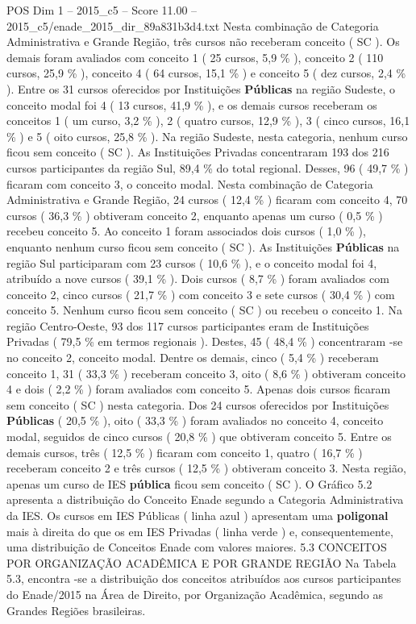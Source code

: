 \begin{textsample}{POS Dim 1 – 2015\_c5 – Score 11.00 – 2015\_c5/enade\_2015\_dir\_89a831b3d4.txt}
Nesta combinação de Categoria Administrativa e Grande Região, três cursos não receberam conceito ( SC ).
Os demais foram avaliados com conceito 1 ( 25 cursos, 5,9 \% ), conceito 2 ( 110 cursos, 25,9 \% ), conceito 4 ( 64 cursos, 15,1 \% ) e conceito 5 ( dez cursos, 2,4 \% ).
Entre os 31 cursos oferecidos por Instituições \textbf{Públicas} na região Sudeste, o conceito modal foi 4 ( 13 cursos, 41,9 \% ), e os demais cursos receberam os conceitos 1 ( um curso, 3,2 \% ), 2 ( quatro cursos, 12,9 \% ), 3 ( cinco cursos, 16,1 \% ) e 5 ( oito cursos, 25,8 \% ).
Na região Sudeste, nesta categoria, nenhum curso ficou sem conceito ( SC ).
As Instituições Privadas concentraram 193 dos 216 cursos participantes da região Sul, 89,4 \% do total regional.
Desses, 96 ( 49,7 \% ) ficaram com conceito 3, o conceito modal.
Nesta combinação de Categoria Administrativa e Grande Região, 24 cursos ( 12,4 \% ) ficaram com conceito 4, 70 cursos ( 36,3 \% ) obtiveram conceito 2, enquanto apenas um curso ( 0,5 \% ) recebeu conceito 5.
Ao conceito 1 foram associados dois cursos ( 1,0 \% ), enquanto nenhum curso ficou sem conceito ( SC ).
As Instituições \textbf{Públicas} na região Sul participaram com 23 cursos ( 10,6 \% ), e o conceito modal foi 4, atribuído a nove cursos ( 39,1 \% ).
Dois cursos ( 8,7 \% ) foram avaliados com conceito 2, cinco cursos ( 21,7 \% ) com conceito 3 e sete cursos ( 30,4 \% ) com conceito 5.
Nenhum curso ficou sem conceito ( SC ) ou recebeu o conceito 1.
Na região Centro-Oeste, 93 dos 117 cursos participantes eram de Instituições Privadas ( 79,5 \% em termos regionais ).
Destes, 45 ( 48,4 \% ) concentraram -se no conceito 2, conceito modal.
Dentre os demais, cinco ( 5,4 \% ) receberam conceito 1, 31 ( 33,3 \% ) receberam conceito 3, oito ( 8,6 \% ) obtiveram conceito 4 e dois ( 2,2 \% ) foram avaliados com conceito 5.
Apenas dois cursos ficaram sem conceito ( SC ) nesta categoria.
Dos 24 cursos oferecidos por Instituições \textbf{Públicas} ( 20,5 \% ), oito ( 33,3 \% ) foram avaliados no conceito 4, conceito modal, seguidos de cinco cursos ( 20,8 \% ) que obtiveram conceito 5.
Entre os demais cursos, três ( 12,5 \% ) ficaram com conceito 1, quatro ( 16,7 \% ) receberam conceito 2 e três cursos ( 12,5 \% ) obtiveram conceito 3.
Nesta região, apenas um curso de IES \textbf{pública} ficou sem conceito ( SC ).
O Gráfico 5.2 apresenta a distribuição do Conceito Enade segundo a Categoria Administrativa da IES.
Os cursos em IES Públicas ( linha azul ) apresentam uma \textbf{poligonal} mais à direita do que os em IES Privadas ( linha verde ) e, consequentemente, uma distribuição de Conceitos Enade com valores maiores. 5.3 CONCEITOS POR ORGANIZAÇÃO ACADÊMICA E POR GRANDE REGIÃO Na Tabela 5.3, encontra -se a distribuição dos conceitos atribuídos aos cursos participantes do Enade/2015 na Área de Direito, por Organização Acadêmica, segundo as Grandes Regiões brasileiras.

\end{textsample}
